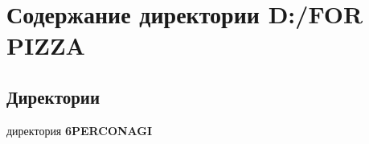 \section{Содержание директории D\+:/\+F\+OR P\+I\+Z\+ZA}
\label{dir_e12ac3dd20216f1b8f87d8ba0a4253be}
\subsection*{Директории}
\begin{DoxyCompactItemize}
\item 
директория \textbf{ 6\+P\+E\+R\+C\+O\+N\+A\+GI}
\end{DoxyCompactItemize}
